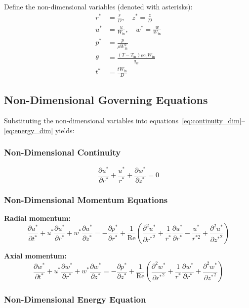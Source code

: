 \documentclass[12pt,a4paper]{article}
\newcommand{\parder}[2]{\frac{\partial #1}{\partial #2}}
\newcommand{\pparder}[2]{\frac{\partial^2 #1}{\partial {#2}^2}}
\newcommand{\Rey}{\text{Re}}
\begin{document}
Define the non-dimensional variables (denoted with asterisks):
\begin{align}
    r^* &= \frac{r}{D}, \quad z^* = \frac{z}{D} \\
    u^* &= \frac{u}{W_{\text{in}}}, \quad w^* = \frac{w}{W_{\text{in}}} \\
    p^* &= \frac{p}{\rho W_{\text{in}}^2} \\
    \theta &= \frac{(T - T_{\text{in}})\rho c_v W_{\text{in}}}{q_w} \\
    t^* &= \frac{t W_{\text{in}}}{D}
\end{align}

\subsection{Non-Dimensional Governing Equations}

Substituting the non-dimensional variables into equations~\eqref{eq:continuity_dim}--\eqref{eq:energy_dim} yields:

\subsubsection{Non-Dimensional Continuity}
\begin{equation}
    \parder{u^*}{r^*} + \frac{u^*}{r^*} + \parder{w^*}{z^*} = 0
    \label{eq:continuity_nondim}
\end{equation}

\subsubsection{Non-Dimensional Momentum Equations}

\textbf{Radial momentum:}
\begin{equation}
    \parder{u^*}{t^*} + u^*\parder{u^*}{r^*} + w^*\parder{u^*}{z^*} = -\parder{p^*}{r^*} + \frac{1}{\Rey}\left(\pparder{u^*}{r^*} + \frac{1}{r^*}\parder{u^*}{r^*} - \frac{u^*}{r^{*2}} + \pparder{u^*}{z^*}\right)
    \label{eq:radial_momentum_nondim}
\end{equation}

\textbf{Axial momentum:}
\begin{equation}
    \parder{w^*}{t^*} + u^*\parder{w^*}{r^*} + w^*\parder{w^*}{z^*} = -\parder{p^*}{z^*} + \frac{1}{\Rey}\left(\pparder{w^*}{r^*} + \frac{1}{r^*}\parder{w^*}{r^*} + \pparder{w^*}{z^*}\right)
    \label{eq:axial_momentum_nondim}
\end{equation}

\subsubsection{Non-Dimensional Energy Equation}
\end{document}
